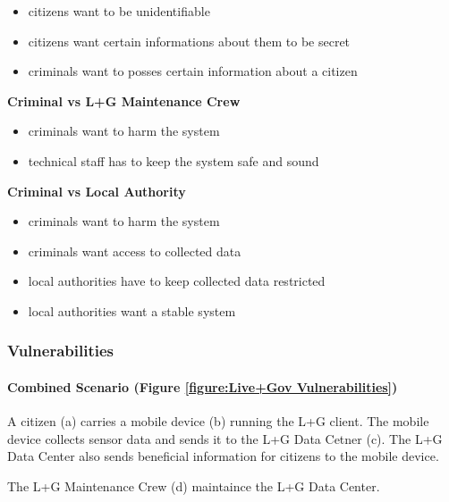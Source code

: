 \begin{itemize}

\item
  citizens want to be unidentifiable
\item
  citizens want certain informations about them to be secret
\item
  criminals want to posses certain information about a citizen
\end{itemize}

\textbf{Criminal vs L+G Maintenance Crew}

\begin{itemize}

\item
  criminals want to harm the system
\item
  technical staff has to keep the system safe and sound
\end{itemize}

\textbf{Criminal vs Local Authority}

\begin{itemize}

\item
  criminals want to harm the system
\item
  criminals want access to collected data
\item
  local authorities have to keep collected data restricted
\item
  local authorities want a stable system
\end{itemize}

\subsubsection{Vulnerabilities}



\paragraph{Combined Scenario (Figure \ref{figure:Live+Gov Vulnerabilities})}

A citizen (a) carries a mobile device (b) running the L+G client. The
mobile device collects sensor data and sends it to the L+G Data Cetner
(c). The L+G Data Center also sends beneficial information for citizens
to the mobile device.

The L+G Maintenance Crew (d) maintaince the L+G Data Center.

